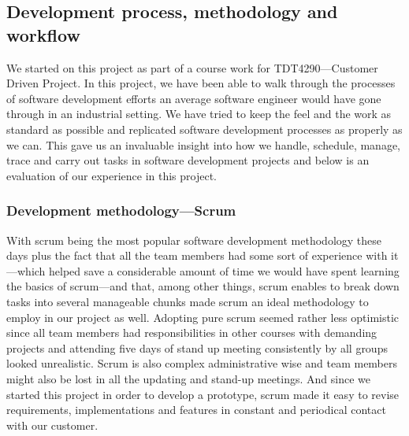 \subsection{Development process, methodology and workflow}

We started on this project as part of a course work for TDT4290---Customer Driven Project. In this project, we have been able to walk through the processes of software development efforts an average software engineer would have gone through in an industrial setting. We have tried to keep the feel and the work as standard as possible and replicated software development processes as properly as we can. This gave us an invaluable insight into how we handle, schedule, manage, trace and carry out tasks in software development projects and below is an evaluation of our experience in this project.
	\subsubsection{Development methodology---Scrum}

With scrum being the most popular software development methodology these days plus the fact that all the team members had some sort of experience with it---which helped save a considerable amount of time we would have spent learning the basics of scrum---and that, among other things, scrum enables to break down tasks into several manageable chunks made scrum an ideal methodology to employ in our project as well. Adopting pure scrum seemed rather less optimistic since all team members had responsibilities in other courses with demanding projects and attending five days of stand up meeting consistently by all groups looked unrealistic. Scrum is also complex administrative wise and team members might also be lost in all the updating and stand-up meetings. And since we started this project in order to develop a prototype, scrum made it easy to revise requirements, implementations and features in constant and periodical contact with our customer. 

